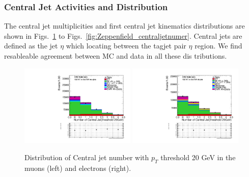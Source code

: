 \subsubsection{Central Jet Activities and Distribution}
\label{sec:cenjetdis}

The central jet multiplicities and first central jet kinematics distributions are shown in Figs.~\ref{fig:centraljetnumer_20} to Figs.~\ref{fig:Zeppenfield_centraljetnumer}. Central jets are defined as the jet $\eta$ which locating between the tagjet pair $\eta$ region. We find resableable agreement between MC and data in all these dis tributions.

\begin{figure}
\begin{center}
\includegraphics[width=0.49\textwidth]{figs/n-1_plots_mu/mu_EWK_W_2jets_centraljetnum_20_mjj_600_tagjet1_60_tagjet2_50_Zeppenfield_1point2_EWKW2jets.pdf}
\includegraphics[width=0.49\textwidth]{figs/n-1_plots_el/el_EWK_W_2jets_centraljetnum_20_mjj_600_tagjet1_60_tagjet2_50_Zeppenfield_1point2_met_30_WmT_30_EWKW2jets.pdf}
\end{center}
\caption{Distribution of Central jet number with $p_{T}$ threshold 20 GeV in the muons (left) and electrons (right).}
\label{fig:centraljetnumer_20}
\end{figure}

